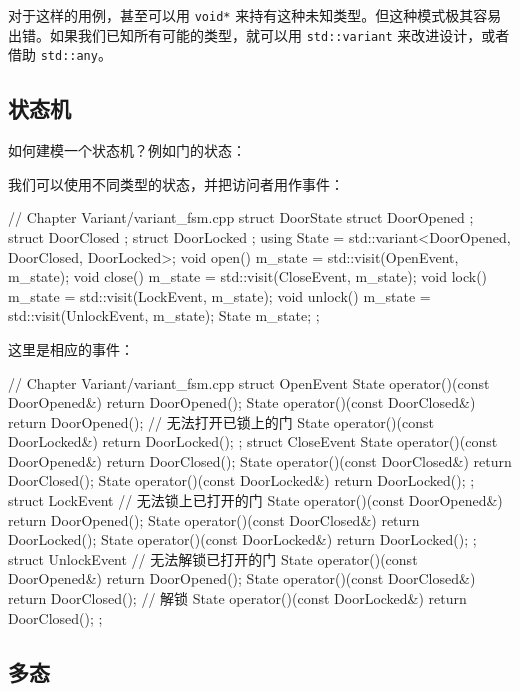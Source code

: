 对于这样的用例，甚至可以用 \texttt{void*} 来持有这种未知类型。但这种模式极其容易出错。如果我们已知所有可能的类型，就可以用 \texttt{std::variant} 来改进设计，或者借助 \texttt{std::any}。

\subsection{状态机}

如何建模一个状态机？例如门的状态：


我们可以使用不同类型的状态，并把访问者用作事件：

\begin{codebox}[cpp]
// Chapter Variant/variant_fsm.cpp
struct DoorState
{
struct DoorOpened {};
struct DoorClosed {};
struct DoorLocked {};
using State = std::variant<DoorOpened, DoorClosed, DoorLocked>;
void open()
{
m_state = std::visit(OpenEvent{}, m_state);
}
void close()
{
m_state = std::visit(CloseEvent{}, m_state);
}
void lock()
{
m_state = std::visit(LockEvent{}, m_state);
}
void unlock()
{
m_state = std::visit(UnlockEvent{}, m_state);
}
State m_state;
};
\end{codebox}

这里是相应的事件：

\begin{codebox}[cpp]
// Chapter Variant/variant_fsm.cpp
struct OpenEvent
{
State operator()(const DoorOpened&){ return DoorOpened(); }
State operator()(const DoorClosed&){ return DoorOpened(); }
// 无法打开已锁上的门
State operator()(const DoorLocked&){ return DoorLocked(); }
};
struct CloseEvent
{
State operator()(const DoorOpened&){ return DoorClosed(); }
State operator()(const DoorClosed&){ return DoorClosed(); }
State operator()(const DoorLocked&){ return DoorLocked(); }
};
struct LockEvent
{
// 无法锁上已打开的门
State operator()(const DoorOpened&){ return DoorOpened(); }
State operator()(const DoorClosed&){ return DoorLocked(); }
State operator()(const DoorLocked&){ return DoorLocked(); }
};
struct UnlockEvent
{
// 无法解锁已打开的门
State operator()(const DoorOpened&){ return DoorOpened(); }
State operator()(const DoorClosed&){ return DoorClosed(); }
// 解锁
State operator()(const DoorLocked&){ return DoorClosed(); }
};
\end{codebox}

\subsection{多态}

